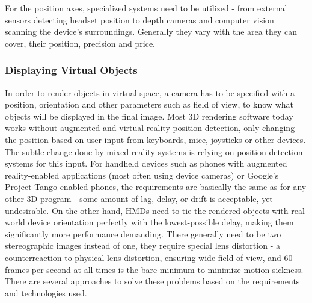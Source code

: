 \documentclass[12pt, a4paper]{article}
\begin{document}
For the position axes, specialized systems need to be utilized - from external sensors detecting headset position to depth cameras and computer vision scanning the device’s surroundings. Generally they vary with the area they can cover, their position, precision and price.

\subsubsection{Displaying Virtual Objects}
In order to render objects in virtual space, a camera has to be specified with a position, orientation and other parameters such as field of view, to know what objects will be displayed in the final image. Most 3D rendering software today works without augmented and virtual reality position detection, only changing the position based on user input from keyboards, mice, joysticks or other devices. The subtle change done by mixed reality systems is relying on position detection systems for this input. For handheld devices such as phones with augmented reality-enabled applications (most often using device cameras) or Google’s Project Tango-enabled phones, the requirements are basically the same as for any other 3D program - some amount of lag, delay, or drift is acceptable, yet undesirable. On the other hand, HMDs need to tie the rendered objects with real-world device orientation perfectly with the lowest-possible delay, making them significantly more performance demanding. There generally need to be two stereographic images instead of one, they require special lens distortion - a counterreaction to physical lens distortion, ensuring wide field of view, and 60 frames per second at all times is the bare minimum to minimize motion sickness. There are several approaches to solve these problems based on the requirements and technologies used.
\end{document}
